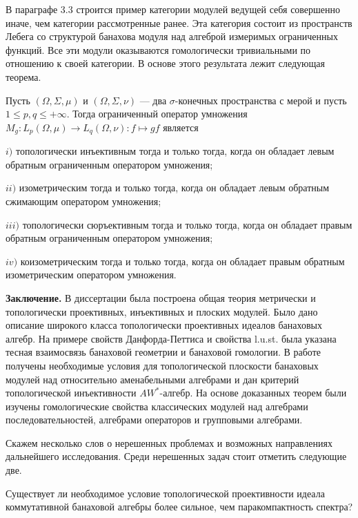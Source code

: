 В параграфе 3.3 строится пример категории модулей ведущей себя совершенно иначе, чем категории рассмотренные ранее. Эта категория состоит из пространств Лебега со структурой банахова модуля над алгеброй измеримых ограниченных функций. Все эти модули оказываются гомологически тривиальными по отношению к своей категории. В основе этого результата лежит следующая теорема.

\begin{theorem*}[3.3.12, 3.3.16, 3.3.19, 3.3.24] Пусть $(\Omega,\Sigma,\mu)$ и $(\Omega,\Sigma,\nu)$ --- два $\sigma$-конечных пространства с мерой и пусть $1\leq p, q\leq+\infty$. Тогда ограниченный оператор умножения $M_g:L_p(\Omega,\mu)\to L_q(\Omega,\nu):f\mapsto gf$ является

$i)$ топологически инъективным тогда и только тогда, когда он обладает левым обратным ограниченным оператором умножения;

$ii)$ изометрическим тогда и только тогда, когда он обладает левым обратным сжимающим оператором умножения;

$iii)$ топологически сюръективным тогда и только тогда, когда он обладает правым обратным ограниченным оператором умножения;

$iv)$ коизометрическим тогда и только тогда, когда он обладает правым обратным изометрическим оператором умножения.
\end{theorem*}

\textbf{Заключение.} В диссертации была построена общая теория метрически и топологически проективных, инъективных и плоских модулей. Было дано описание широкого класса топологически проективных идеалов банаховых алгебр. На примере свойств Данфорда-Петтиса и свойства l.u.st. была указана тесная взаимосвязь банаховой геометрии и банаховой гомологии. В работе получены необходимые условия для топологической плоскости банаховых модулей над относительно аменабельными алгебрами и дан критерий топологической инъективности $AW^*$-алгебр. На основе доказанных теорем были изучены гомологические свойства классических модулей над алгебрами последовательностей, алгебрами операторов и групповыми алгебрами.

Скажем несколько слов о нерешенных проблемах и возможных направлениях дальнейшего исследования. Среди нерешенных задач стоит отметить следующие две.

\begin{problem*} Существует ли необходимое условие топологической проективности  идеала коммутативной банаховой алгебры более сильное, чем паракомпактность спектра?
\end{problem*}


